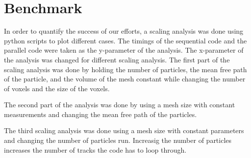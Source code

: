 \section{Benchmark}
In order to quantify the success of our efforts, a scaling analysis was done 
using python scripts to plot different cases. The timings of the sequential 
code and the parallel code were taken as the y-parameter of the analysis. 
The x-parameter of the analysis was changed for different scaling analysis.  
The first part of the scaling analysis was done by holding the number of particles, 
the mean free path of the particle, and the volume of the mesh constant while changing 
the number of voxels and the size of the voxels. 


The second part of the analysis was done by using a mesh size with constant measurements 
and changing the mean free path of the particles. 


The third scaling analysis was done using a mesh size with constant parameters and 
changing the number of particles run. Increasig the number of particles increases the 
number of tracks the code has to loop through. 
